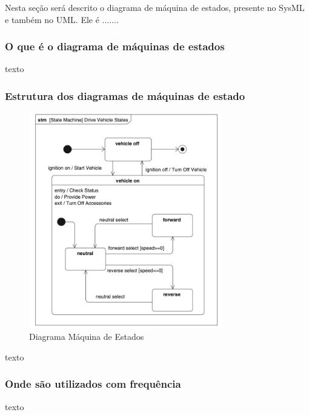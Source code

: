 Nesta seção será descrito o diagrama de máquina de estados, presente no SysML e também no UML. Ele é .......

\subsubsection{O que é o diagrama de máquinas de estados}
texto

\subsubsection{Estrutura dos diagramas de máquinas de estado}
\begin{figure}[h!]
\centering
\includegraphics[width=0.75\textwidth]{figures/diagrama-maquina-estados.jpeg}
\caption{Diagrama Máquina de Estados}
\end{figure}
texto

\subsubsection{Onde são utilizados com frequência}
texto